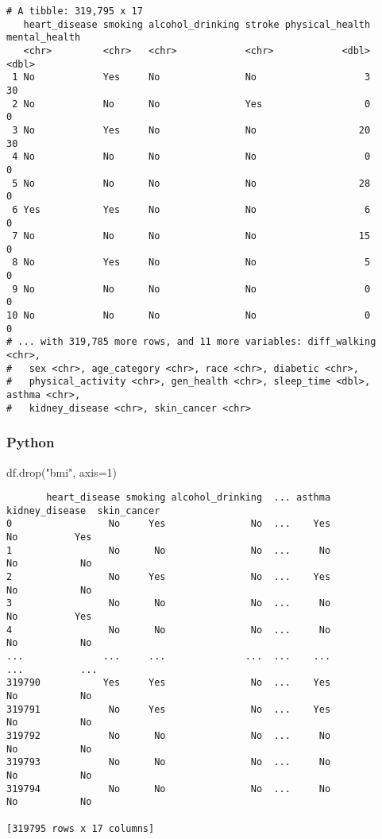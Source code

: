 \documentclass[
  letterpaper,
  DIV=11,
  numbers=noendperiod]{scrreprt}
\newenvironment{Shaded}{\begin{snugshade}}{\end{snugshade}}
\newcommand{\DecValTok}[1]{\textcolor[rgb]{0.68,0.00,0.00}{#1}}
\newcommand{\NormalTok}[1]{\textcolor[rgb]{0.00,0.46,0.62}{#1}}
\newcommand{\OperatorTok}[1]{\textcolor[rgb]{0.37,0.37,0.37}{#1}}
\newcommand{\StringTok}[1]{\textcolor[rgb]{0.13,0.47,0.30}{#1}}
\begin{document}
\begin{verbatim}
# A tibble: 319,795 x 17
   heart_disease smoking alcohol_drinking stroke physical_health mental_health
   <chr>         <chr>   <chr>            <chr>            <dbl>         <dbl>
 1 No            Yes     No               No                   3            30
 2 No            No      No               Yes                  0             0
 3 No            Yes     No               No                  20            30
 4 No            No      No               No                   0             0
 5 No            No      No               No                  28             0
 6 Yes           Yes     No               No                   6             0
 7 No            No      No               No                  15             0
 8 No            Yes     No               No                   5             0
 9 No            No      No               No                   0             0
10 No            No      No               No                   0             0
# ... with 319,785 more rows, and 11 more variables: diff_walking <chr>,
#   sex <chr>, age_category <chr>, race <chr>, diabetic <chr>,
#   physical_activity <chr>, gen_health <chr>, sleep_time <dbl>, asthma <chr>,
#   kidney_disease <chr>, skin_cancer <chr>
\end{verbatim}

\hypertarget{python-21}{%
\subsubsection{Python}\label{python-21}}

\begin{Shaded}
\begin{Highlighting}[]
\NormalTok{df.drop(}\StringTok{"bmi"}\NormalTok{, axis}\OperatorTok{=}\DecValTok{1}\NormalTok{)}
\end{Highlighting}
\end{Shaded}

\begin{verbatim}
       heart_disease smoking alcohol_drinking  ... asthma  kidney_disease  skin_cancer
0                 No     Yes               No  ...    Yes              No          Yes
1                 No      No               No  ...     No              No           No
2                 No     Yes               No  ...    Yes              No           No
3                 No      No               No  ...     No              No          Yes
4                 No      No               No  ...     No              No           No
...              ...     ...              ...  ...    ...             ...          ...
319790           Yes     Yes               No  ...    Yes              No           No
319791            No     Yes               No  ...    Yes              No           No
319792            No      No               No  ...     No              No           No
319793            No      No               No  ...     No              No           No
319794            No      No               No  ...     No              No           No

[319795 rows x 17 columns]
\end{verbatim}
\end{document}
